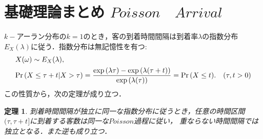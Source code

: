 \documentclass[a4j,papersize,disablejfam,slide,14pt]{jsarticle}
\newtheorem{Prop}{定理}
\def\exp#1{\mbox{${\rm exp} \left( #1 \right)$}} %
\def\prob#1{\mbox{${\rm Pr} \left( #1 \right)$}} %
\def\cprob#1#2{\mbox{${\rm Pr} \left( #1 | #2 \right)$}} %
\begin{document}
\section{基礎理論まとめ \qquad $Poisson\quad Arrival$}
	$k-$アーラン分布の$k = 1$のとき，客の到着時間間隔は到着率$\lambda$の指数分布$E_X(\lambda)$に従う．指数分布は無記憶性を有つ:
    \begin{eqnarray}
    	&X(\omega) \sim E_X(\lambda),\\
    	&\cprob{X \leq \tau+t}{X > \tau} = \frac{\exp{\lambda \tau} - \exp{\lambda (\tau+t)}}{\exp{\lambda (\tau)}} = \prob{X \leq t}. \quad (\tau,t > 0)
    \end{eqnarray}
    この性質から，次の定理が成り立つ．
    \begin{screen}
    	\begin{Prop}
    		到着時間間隔が独立に同一な指数分布に従うとき，任意の時間区間$(\tau, \tau + t]$に到着する客数は同一な$Poisson$過程に従い，
    		重ならない時間間隔では独立となる．また逆も成り立つ．
        \end{Prop}
    \end{screen}
\end{document}
